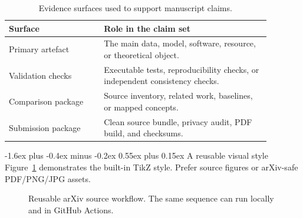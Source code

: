 \documentclass[11pt]{article}
\makeatletter
\renewcommand\subsection{\@startsection{subsection}{2}{\z@}%
  {-1.6ex plus -0.4ex minus -0.2ex}%
  {0.55ex plus 0.15ex}%
  {\normalfont\large\bfseries\color{templateInk}}}
\makeatother
\begin{document}
\begin{table}[ht]
\centering
\caption{Evidence surfaces used to support manuscript claims.}
\label{tab:evidence-surfaces}
\begin{tabular}{p{0.32\linewidth}p{0.56\linewidth}}
\toprule
Surface & Role in the claim set \\
\midrule
Primary artefact & The main data, model, software, resource, or theoretical object. \\
Validation checks & Executable tests, reproducibility checks, or independent consistency checks. \\
Comparison package & Source inventory, related work, baselines, or mapped concepts. \\
Submission package & Clean source bundle, privacy audit, PDF build, and checksums. \\
\bottomrule
\end{tabular}
\end{table}

\subsection{A reusable visual style}
Figure~\ref{fig:workflow} demonstrates the built-in TikZ style. Prefer source figures or arXiv-safe PDF/PNG/JPG assets.

\begin{figure}[ht]
\centering
{}
\caption{Reusable arXiv source workflow. The same sequence can run locally and in GitHub Actions.}
\label{fig:workflow}
\end{figure}
\end{document}
